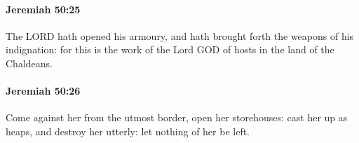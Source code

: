 		\paragraph{Jeremiah 50:25} %
			\label{JEREMIAH-50-25}

			The LORD hath opened his armoury, and hath brought forth the weapons of his indignation: for this is the work of the Lord GOD of hosts in the land of the Chaldeans.


		\paragraph{Jeremiah 50:26} %
			\label{JEREMIAH-50-26}

			Come against her from the utmost border, open her storehouses: cast her up as heaps, and destroy her utterly: let nothing of her be left.


